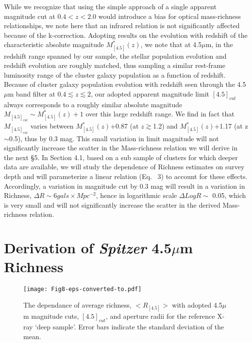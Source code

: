 \documentclass[apj,twocolumn]{emulateapj}
\begin{document}
{While we recognize that using the simple approach of a single  apparent magnitude cut  at $0.4<z<2.0$ would introduce a bias for optical mass-richness relationships, we note here that an infrared relation is not significantly affected because of the k-correction. Adopting \citet{Mancone10} results on the evolution with redshift of the characteristic absolute magnitude $M^{*}_{[4.5]}(z)$, we note that  at 4.5$\mu$m, in the redshift range spanned by our sample, the stellar population evolution and redshift evolution  are roughly matched, thus sampling a similar rest-frame luminosity range of the cluster galaxy population as a function of redshift. Because of cluster galaxy population evolution with redshift seen through the 4.5$\mu$m band filter at $0.4\lesssim z \lesssim 2$, our adopted apparent magnitude limit $[4.5]_{cut}$ always corresponds to a roughly similar absolute magnitude $M_{[4.5]_{cut}}\sim M^{*}_{[4.5]}(z)+1$ over this large redshift range. We find in fact that $M_{[4.5]_{cut}}$ varies between $M^{*}_{[4.5]}(z)$+0.87 (at $z\gtrsim$1.2) and $M^{*}_{[4.5]}(z)$+1.17 (at z$\sim$0.5), thus by 0.3 mag. This small variation in limit magnitude will not significantly increase the scatter in the Mass-richness relation we will derive in the next \S5. In Section 4.1, based on a sub sample of clusters for which deeper data are available, we will study the dependence of Richness estimates on survey depth and will parameterize a linear relation (Eq. ~3) to account for these effects. Accordingly, a  variation in magnitude cut by 0.3 mag will result in a variation in Richness, $\Delta R\sim6 gals \times Mpc^{-2}$, hence in logarithmic scale  $\Delta Log R\sim$ 0.05, which is very small and will not significantly increase the scatter in the derived Mass-richness relation.

\section{Derivation of {\it Spitzer} 4.5$\mu$m Richness }

\begin{figure}[t!]
\texttt{[image: Fig8-eps-converted-to.pdf]}
\caption{The dependance of average richness, $<R_{[4.5]}>$  with adopted 4.5$\mu$m magnitude cuts,  $[4.5]_{cut}$, and aperture radii for the reference X-ray `deep sample'. Error bars indicate the standard deviation of the mean.}
\label{magdepth}
\end{figure}

}
\end{document}
